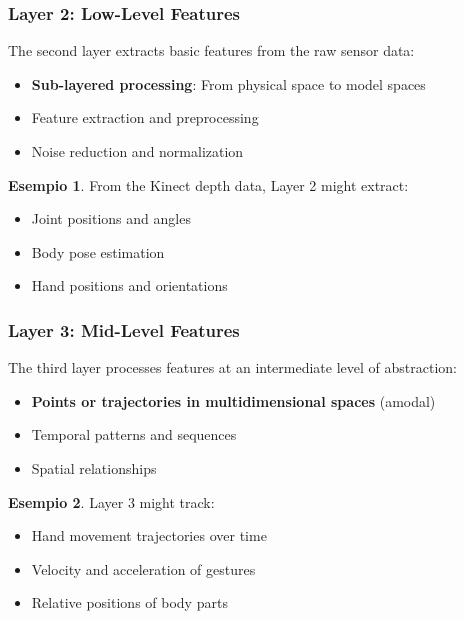 \documentclass[11pt,a4paper]{article}
\theoremstyle{definition}
\newtheorem{example}{Esempio}[section]
\theoremstyle{plain}
\theoremstyle{remark}
\begin{document}
\subsubsection{Layer 2: Low-Level Features}

The second layer extracts basic features from the raw sensor data:

\begin{itemize}
    \item \textbf{Sub-layered processing}: From physical space to model spaces
    \item Feature extraction and preprocessing
    \item Noise reduction and normalization
\end{itemize}

\begin{example}
From the Kinect depth data, Layer 2 might extract:
\begin{itemize}
    \item Joint positions and angles
    \item Body pose estimation
    \item Hand positions and orientations
\end{itemize}
\end{example}

\subsubsection{Layer 3: Mid-Level Features}

The third layer processes features at an intermediate level of abstraction:

\begin{itemize}
    \item \textbf{Points or trajectories in multidimensional spaces} (amodal)
    \item Temporal patterns and sequences
    \item Spatial relationships
\end{itemize}

\begin{example}
Layer 3 might track:
\begin{itemize}
    \item Hand movement trajectories over time
    \item Velocity and acceleration of gestures
    \item Relative positions of body parts
\end{itemize}
\end{example}
\end{document}
